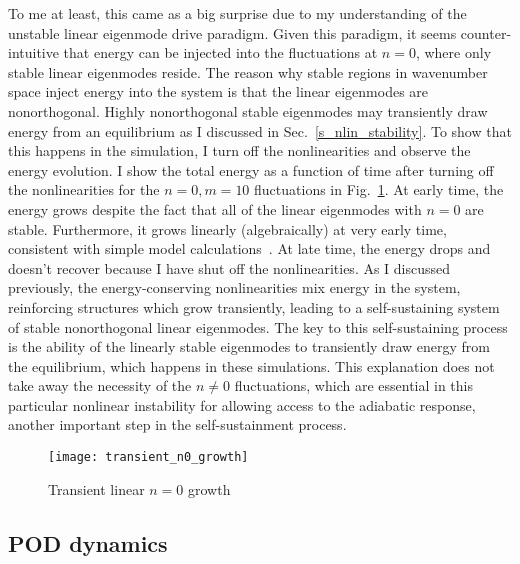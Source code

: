 To me at least, this came as a big surprise due to my understanding of the unstable linear eigenmode drive paradigm.
Given this paradigm, it seems counter-intuitive that energy can be injected into the fluctuations at $n=0$, where only
stable linear eigenmodes reside. 
The reason why stable regions in wavenumber space inject energy into the system is that the linear eigenmodes are nonorthogonal. 
Highly nonorthogonal stable eigenmodes may transiently draw energy from an equilibrium as I discussed in Sec.~\ref{s_nlin_stability}.
To show that this happens in the simulation, I turn off the nonlinearities and observe the energy evolution. I show the total energy as a function of time after turning off the nonlinearities
for the $n=0,m=10$ fluctuations in Fig.~\ref{transient_n0_growth}. At early time, the energy grows despite the fact that all of the linear eigenmodes with $n=0$ are stable. Furthermore,
it grows linearly (algebraically) at very early time, consistent with simple model calculations~\cite{waleffe1995}. 
At late time, the energy drops and doesn't recover because I have shut off the nonlinearities. As I discussed previously, 
the energy-conserving nonlinearities mix energy in the system, reinforcing structures which grow transiently, leading to a self-sustaining system of stable nonorthogonal linear eigenmodes.
The key to this self-sustaining process is the ability of the linearly stable eigenmodes to transiently draw energy from the equilibrium, which happens in these simulations.
This explanation does not take away the necessity of the $n \ne 0$ fluctuations, which are essential in this particular nonlinear instability for allowing access to the adiabatic response,
another important step in the self-sustainment process.

\begin{figure}
\centerline{\texttt{[image: transient\_n0\_growth]}}
\caption{Transient linear $n=0$ growth}
\label{transient_n0_growth}
\end{figure}

\subsection{POD dynamics}
\label{ss_pod_dynamics}

